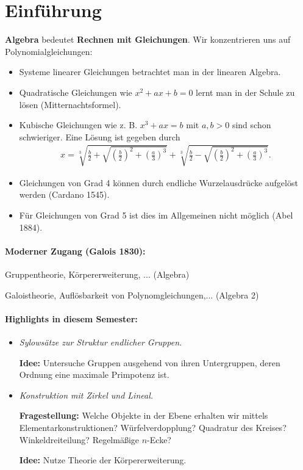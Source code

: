 
\section{Einführung}
\textbf{Algebra} bedeutet \textbf{Rechnen mit Gleichungen}. Wir konzentrieren uns auf Polynomialgleichungen:
\begin{itemize}
	\item Systeme linearer Gleichungen betrachtet man in der linearen Algebra.
	\item Quadratische Gleichungen wie $x^2 + ax + b  = 0$ lernt man in der Schule zu lösen (Mitternachtsformel).
	\item Kubische Gleichungen wie z. B. $x^3 + ax = b$ mit $a,b > 0$ sind schon schwieriger. Eine Lösung ist gegeben durch
	\begin{align*}
		x = \sqrt[3]{\frac{b}{2} + \sqrt{\left(\frac{b}{2}\right)^2 + \left(\frac{a}{3}\right)^3}} + \sqrt[3]{\frac{b}{2} - \sqrt{\left(\frac{b}{2}\right)^2 + \left(\frac{a}{3}\right)^3}}.
	\end{align*}
	\item Gleichungen von Grad 4 können durch endliche Wurzelausdrücke aufgelöst werden (Cardano 1545).
	\item Für Gleichungen von Grad 5 ist dies im Allgemeinen nicht möglich (Abel 1884).
\end{itemize}

\paragraph{Moderner Zugang (Galois 1830): }
Gruppentheorie, Körpererweiterung, ... (Algebra)

Galoistheorie, Auflösbarkeit von Polynomgleichungen,... (Algebra 2)

\paragraph{Highlights in diesem Semester: } 
\begin{itemize}
	\item \textit{Sylowsätze zur Struktur endlicher Gruppen.}
	
	\textbf{Idee: } Untersuche Gruppen ausgehend von ihren Untergruppen, deren Ordnung eine maximale Primpotenz ist.
	\item \textit{Konstruktion mit Zirkel und Lineal.}
	
	\textbf{Fragestellung: } Welche Objekte in der Ebene erhalten wir mittels Elementarkonstruktionen? Würfelverdopplung? Quadratur des Kreises? Winkeldreiteilung? Regelmäßige $n$-Ecke?
	
	\textbf{Idee: } Nutze Theorie der Körpererweiterung.
\end{itemize}
